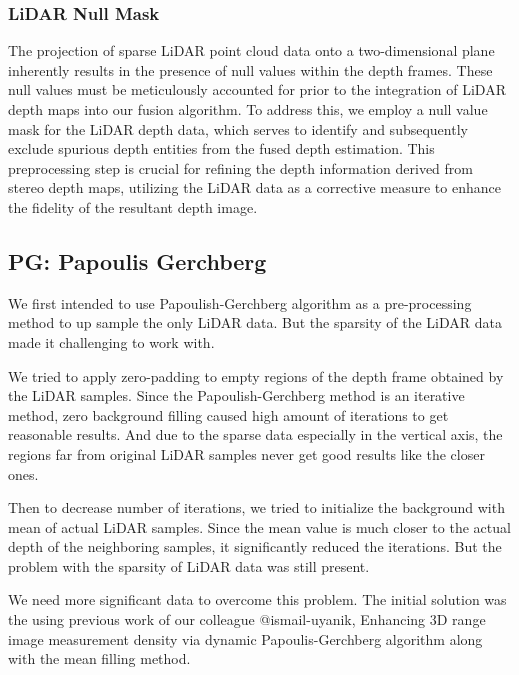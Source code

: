 \documentclass[conference]{IEEEtran}
\begin{document}
\subsubsection{LiDAR Null Mask}

The projection of sparse LiDAR point cloud data onto a two-dimensional plane inherently results in the presence of null values within the depth frames. These null values must be meticulously accounted for prior to the integration of LiDAR depth maps into our fusion algorithm. To address this, we employ a null value mask for the LiDAR depth data, which serves to identify and subsequently exclude spurious depth entities from the fused depth estimation. This preprocessing step is crucial for refining the depth information derived from stereo depth maps, utilizing the LiDAR data as a corrective measure to enhance the fidelity of the resultant depth image.

\subsection{PG: Papoulis Gerchberg}
We first intended to use Papoulish-Gerchberg algorithm as a pre-processing method to up sample the only LiDAR data. But the sparsity of the LiDAR data made it challenging to work with.

We tried to apply zero-padding to empty regions of the depth frame obtained by the LiDAR samples. Since the Papoulish-Gerchberg method is an iterative method, zero background filling caused high amount of iterations to get reasonable results. And due to the sparse data especially in the vertical axis, the regions far from original LiDAR samples never get good results like the closer ones.

Then to decrease number of iterations, we tried to initialize the background with mean of actual LiDAR samples. Since the mean value is much closer to the actual depth of the neighboring samples, it significantly reduced the iterations. But the problem with the sparsity of LiDAR data was still present.

We need more significant data to overcome this problem. The initial solution was the using previous work of our colleague @ismail-uyanik, {Enhancing 3D range image measurement density via dynamic Papoulis-Gerchberg algorithm} along with the mean filling method.
\end{document}
